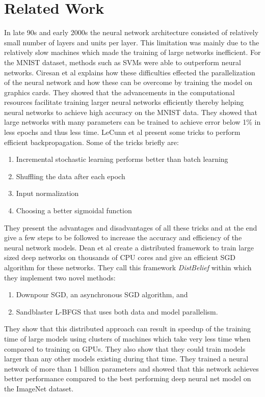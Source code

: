 \documentclass{sig-alternate-05-2015}
\begin{document}
\section{Related Work} \label{RW}
In late 90s and early 2000s the neural network architecture consisted of relatively small number of layers and units per layer. This limitation was mainly due to the relatively slow machines which made the training of large networks inefficient. For the MNIST dataset, methods such as SVMs were able to outperform neural networks. Ciresan et al \cite{ciresan2010deep} explains how these difficulties effected the parallelization of the neural network and how these can be overcome by training the model on graphics cards. They showed that the advancements in the computational resources facilitate training larger neural networks efficiently thereby helping neural networks to achieve high accuracy on the MNIST data. They showed that large networks with many parameters can be trained to achieve error below 1\% in less epochs and thus less time.
LeCunn et al \cite{lecun2012efficient} present some tricks to perform efficient backpropagation. Some of the tricks briefly are: 
\begin{enumerate}
\item Incremental stochastic learning performs better than batch learning
\item Shuffling the data after each epoch
\item Input normalization
\item Choosing a better sigmoidal function
\end{enumerate}
They present the advantages and disadvantages of all these tricks and at the end give a few steps to be followed to increase the accuracy and efficiency of the neural network models.
Dean et al \cite{dean2012large} create a distributed framework to train large sized deep networks on
thousands of CPU cores and give an efficient SGD algorithm for these networks. They call this framework \textit{DistBelief} within which they implement two novel methods:\\
\begin{enumerate}
\item Downpour SGD, an asynchronous SGD algorithm, and
\item Sandblaster L-BFGS that uses both data and model parallelism. 
\end{enumerate}
They show that this distributed approach can result in speedup of the training time of large models using clusters of machines which take very less time when compared to training on GPUs. They also show that they could train models larger than any other models existing during that time. They trained a neural network of more than 1 billion parameters and showed that this network achieves better performance compared to the best performing deep neural net model on the ImageNet dataset.
\end{document}
